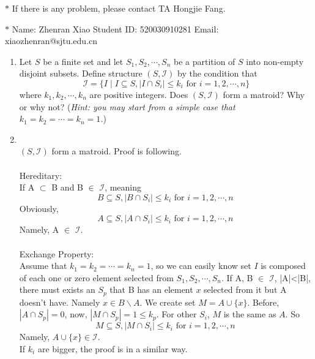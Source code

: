 \documentclass[12pt,a4paper]{article}
\makeatletter
\newtheorem*{solution}{Solution}
\theoremstyle{definition}
\renewenvironment{solution}[1][Solution] {\par\pushQED{\qed}\normalfont\topsep6\p@\@plus6\p@\relax\trivlist\item[\hskip\labelsep\bfseries#1\@addpunct{.}]\ignorespaces}{\popQED\endtrivlist\@endpefalse} \makeatother
\makeatother
\begin{document}
\noindent

\noindent{}
\begin{center}
\footnotesize{\color{red}$*$ If there is any problem, please contact TA Hongjie Fang.}

\footnotesize{\color{blue}$*$ Name: Zhenran Xiao  \quad Student ID: 520030910281 \quad Email: xiaozhenran@sjtu.edu.cn}
\end{center}

\begin{enumerate}
	\item Let $S$ be a finite set and let $S_1, S_2, \cdots, S_n$ be a partition of $S$ into non-empty disjoint subsets. Define structure $(S, \mathcal{I})$ by the condition that 
	$$
	\mathcal{I} = \{I \mid I \subseteq S, \left|I \cap S_i \right| \leq k_i \textrm{ for } i=1,2,\cdots,n\}
	$$
	where $k_1, k_2, \cdots, k_n$ are positive integers. Does $(S, \mathcal{I})$ form a matroid? Why or why not? (\textit{\color{blue}Hint: you may start from a simple case that $k_1 = k_2 = \cdots = k_n = 1$.})
	
	    \begin{solution}
	    	\quad \\
	    	$(S, \mathcal{I})$ form a matroid. Proof is following. \\
	    	\quad \\
	        Hereditary: \\
	        If A $\subset$ B and B $\in$ $\mathcal{I}$, meaning
	        $$
	        B \subseteq S, \left|B \cap S_i \right| \leq k_i \textrm{ for } i=1,2,\cdots,n\
	        $$
	        Obviously, 
	        $$
	        A \subseteq S, \left|A \cap S_i \right| \leq k_i \textrm{ for } i=1,2,\cdots,n\
	        $$
	        Namely, A $\in$ $\mathcal{I}$. \\
	        \quad \\
	        Exchange Property: \\
	        Assume that $k_1 = k_2 = \cdots = k_n = 1$, so we can easily know set $I$ is composed of each one or zero element selected from $S_1, S_2, \cdots, S_n$. If A, B $\in$ $\mathcal{I}$, |A|<|B|, there must exists an $S_p$ that B has an element $x$ selected from it but A doesn't have. Namely $x \in B\backslash A$. We create set $M = A \cup \{x\}$. Before, $\left|A \cap S_p \right| = 0$, now, $\left|M \cap S_p \right| = 1 \leq k_p$. For other $S_i$, $M$ is the same as $A$. So 
	        $$
	        M \subseteq S, \left|M \cap S_i \right| \leq k_i \textrm{ for } i=1,2,\cdots,n\
	        $$
	        Namely, $A \cup \{x\} \in \mathcal{I}$. \\
	        If $k_i$ are bigger, the proof is in a similar way.
	    \end{solution}
	

\end{enumerate}
\end{document}
